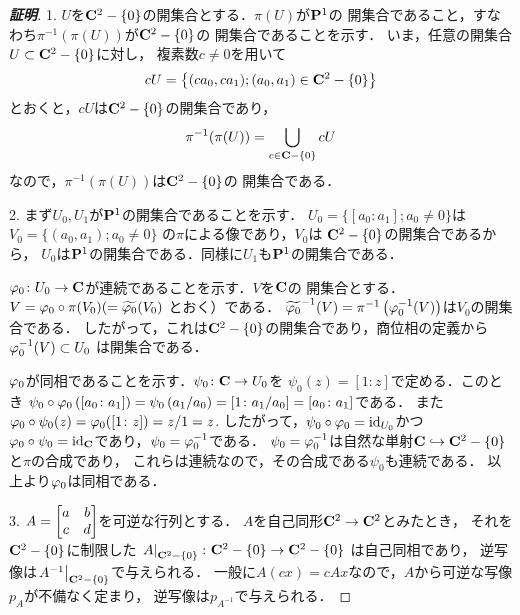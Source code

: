\begin{proof}[\textbf{証明}]
    1. 
    $U$を$\mathbf{C}^2-\{0\}$の開集合とする．$\pi(U)$が$\mathbf{P}^1$の
    開集合であること，すなわち$\pi^{-1}(\pi(U))$が$\mathbf{C}^2-\{0\}$の
    開集合であることを示す．
    いま，任意の開集合$U\subset\mathbf{C}^2-\{0\}$に対し，
    複素数$c\neq0$を用いて
    \begin{align*}
        cU = \left\{(ca_0,ca_1); (a_0,a_1)\in\mathbf{C}^2-\{0\}\right\}
    \end{align*}
    とおくと，$cU$は$\mathbf{C}^2-\{0\}$の開集合であり，
    \begin{align*}\label{eq:proj}
        \pi^{-1}(\pi(U)) = \bigcup_{c\in\cc-\{0\}} cU %
    \end{align*}
    なので，$\pi^{-1}(\pi(U))$は$\mathbf{C}^2-\{0\}$の
    開集合である．

    2. 
    まず$U_0, U_1$が$\mathbf{P}^1$の開集合であることを示す．
    $U_0=\{[a_0:a_1]; a_0\neq0\}$は$V_0=\{(a_0,a_1);a_0\neq0\}$
    の$\pi$による像であり，$V_0$は
    $\mathbf{C}^2-\{0\}$の開集合であるから，
    $U_0$は$\mathbf{P}^1$の開集合である．同様に$U_1$も$\mathbf{P}^1$の開集合である．

    $\varphi_0\colon U_0\to\mathbf{C}$が連続であることを示す．$V$を$\mathbf{C}$の
    開集合とする．
    $V=\varphi_0\circ\pi(V_0) (= \widetilde{\varphi_0}(V_0)$
    とおく）である．
    $\widetilde{\varphi_0}^{-1}(V) 
    = \pi^{-1}\left(\varphi_0^{-1}(V)\right)$は$V_0$の開集合である．
    したがって，これは$\mathbf{C}^2-\{0\}$の開集合であり，商位相の定義から$\varphi_0^{-1}(V)\subset U_0$
    は開集合である．
    
    $\varphi_0$が同相であることを示す．$\psi_0\colon \mathbf{C} \to U_0$を
    $\psi_0(z)=[1\colon z]$で定める．このとき
    $\psi_0\circ\varphi_0\left([a_0\colon a_1]\right)
    =\psi_0\left( a_1/a_0 \right)
    =[1\colon a_1/a_0]=[a_0\colon a_1]$である．
    また$\varphi_0\circ\psi_0(z)=\varphi_0([1\colon z])=z/1=z$.
    したがって，$\psi_0\circ\varphi_0=\mathrm{id}_{U_0}$かつ
    $\varphi_0\circ\psi_0=\mathrm{id}_{\mathbf{C}}$であり，$\psi_0=\varphi_0^{-1}$である．
    $\psi_0=\varphi_0^{-1}$は自然な単射$\mathbf{C} 
    \hookrightarrow \mathbf{C}^2-\{0\}$と$\pi$の合成であり，
    これらは連続なので，その合成である$\psi_0$も連続である．
    以上より$\varphi_0$は同相である．

    3. 
    $\displaystyle A = \begin{bmatrix}
        a&b\\c&d
    \end{bmatrix}$を可逆な行列とする．
    $A$を自己同形$\mathbf{C}^2\to\mathbf{C}^2$とみたとき，
    それを$\mathbf{C}^2-\{0\}$に制限した
    $\left. A \right|_{\mathbf{C}^2-\{0\}}\colon\mathbf{C}^2-\{0\}\to\mathbf{C}^2-\{0\}$
    は自己同相であり，
    逆写像は$\left. A^{-1} \right|_{\mathbf{C}^2-\{0\}}$で与えられる．
    一般に$A(cx)=cAx$なので，$A$から可逆な写像$p_A$が不備なく定まり，
    逆写像は$p_{A^{-1}}$で与えられる．


\end{proof}
